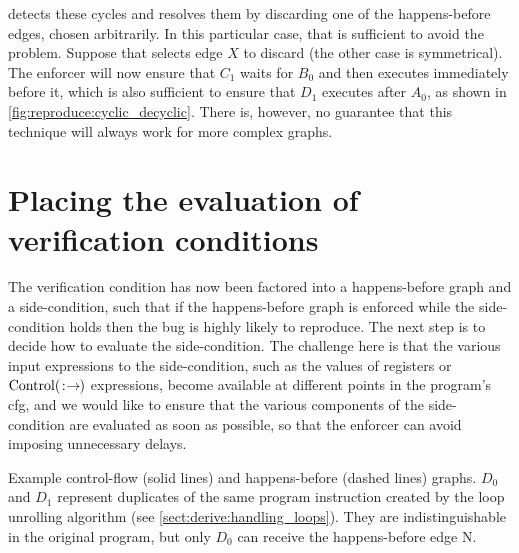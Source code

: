 {\Technique} detects these cycles and resolves them by discarding one
of the happens-before edges, chosen arbitrarily.  In this particular
case, that is sufficient to avoid the problem.  Suppose that
{\technique} selects edge $X$ to discard (the other case is
symmetrical).  The enforcer will now ensure that $C_1$ waits for $B_0$
and then executes immediately before it, which is also sufficient to
ensure that $D_1$ executes after $A_0$, as shown in
\autoref{fig:reproduce:cyclic_decyclic}.  There is, however, no
guarantee that this technique will always work for more complex
graphs.

\section{Placing the evaluation of verification conditions}
\label{sect:enforce:place_vcs}

The verification condition has now been factored into a happens-before
graph and a side-condition, such that if the happens-before graph is
enforced while the side-condition holds then the bug is highly likely
to reproduce.  The next step is to decide how to evaluate the
side-condition.  The challenge here is that the various input
expressions to the side-condition, such as the values of registers or
${\mathrm{Control}}(\mathrm{}\!:\!\mathrm{\!}\!\rightarrow\!\mathrm{\!})$ expressions, become available at different
points in the program's \gls{cfg}, and we would like to ensure that
the various components of the side-condition are evaluated as soon as
possible, so that the enforcer can avoid imposing unnecessary delays.

\begin{sanefig}
  \vspace{-8pt}
  \vspace{-4pt}
  \caption{Example control-flow (solid lines) and happens-before
    (dashed lines) graphs.  $D_0$ and $D_1$ represent duplicates of
    the same program instruction created by the loop unrolling
    algorithm (see \autoref{sect:derive:handling_loops}).  They are
    indistinguishable in the original program, but only $D_0$ can
    receive the happens-before edge N.}
  \label{fig:place_conditions_example}
  \vspace{4pt}
\end{sanefig}

